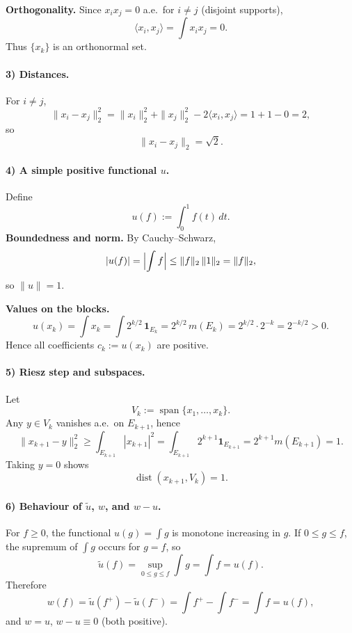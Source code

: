 \documentclass[12pt,a4paper]{article}
\theoremstyle{plain}
\theoremstyle{definition}
\theoremstyle{remark}
\theoremstyle{remark}
\theoremstyle{definition}
\begin{document}
	\textbf{Orthogonality.}\quad
	Since $x_i x_j=0$ a.e.\ for $i\ne j$ (disjoint supports),
	\[
	\langle x_i,x_j\rangle=\int x_i x_j = 0.
	\]
	Thus $\{x_k\}$ is an orthonormal set.
	
	\bigskip
	
	\paragraph{3) Distances.}
	For $i\ne j$,
	\[
	\|x_i-x_j\|_2^2
	= \|x_i\|_2^2+\|x_j\|_2^2 - 2\langle x_i,x_j\rangle
	= 1+1-0=2,
	\]
	so
	\[
	\|x_i-x_j\|_2=\sqrt{2}.
	\]
	
	\bigskip
	
	\paragraph{4) A simple positive functional $u$.}
	Define
	\[
	u(f):=\int_0^1 f(t)\,dt.
	\]
	\textbf{Boundedness and norm.}\quad
	By Cauchy--Schwarz,
	\[
	|u(f)| = \Bigl|\int f\Bigr|
	\le \|f\|_2\,\|1\|_2
	= \|f\|_2,
	\]
	so $\|u\|=1$.
	
	\textbf{Values on the blocks.}\quad
	\[
	u(x_k)
	= \int x_k
	= \int 2^{k/2}\,\mathbf 1_{E_k}
	= 2^{k/2}\,m(E_k)
	= 2^{k/2}\cdot 2^{-k}
	= 2^{-k/2} > 0.
	\]
	Hence all coefficients $c_k:=u(x_k)$ are positive.
	
	\bigskip
	
	\paragraph{5) Riesz step and subspaces.}
	Let
	\[
	V_k := \operatorname{span}\{x_1,\dots,x_k\}.
	\]
	Any $y\in V_k$ vanishes a.e.\ on $E_{k+1}$, hence
	\[
	\|x_{k+1}-y\|_2^2
	\ge \int_{E_{k+1}}|x_{k+1}|^2
	= \int_{E_{k+1}}2^{k+1}\mathbf 1_{E_{k+1}}
	= 2^{k+1}m(E_{k+1}) = 1.
	\]
	Taking $y=0$ shows
	\[
	\operatorname{dist}(x_{k+1},V_k)=1.
	\]
	
	\bigskip
	
	\paragraph{6) Behaviour of $\tilde u$, $w$, and $w-u$.}
	For $f\ge0$, the functional $u(g)=\int g$ is monotone increasing in $g$.
	If $0\le g\le f$, the supremum of $\int g$ occurs for $g=f$, so
	\[
	\tilde u(f)
	= \sup_{0\le g\le f} \int g
	= \int f = u(f).
	\]
	Therefore
	\[
	w(f) = \tilde u(f^+) - \tilde u(f^-)
	= \int f^+ - \int f^- = \int f = u(f),
	\]
	and $w=u$, $w-u\equiv0$ (both positive).
	
\end{document}
